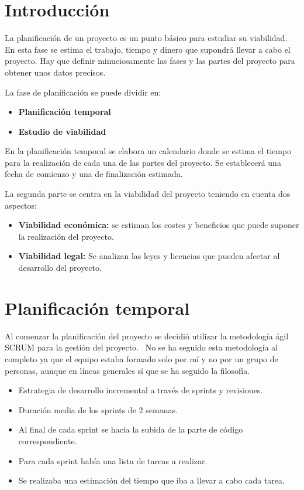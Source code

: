 
\section{Introducción}
La planificación de un proyecto es un punto básico para estudiar su viabilidad. En esta fase se estima el trabajo, tiempo y dinero que supondrá llevar a cabo el proyecto.
Hay que definir minuciosamente las fases y las partes del proyecto para obtener unos datos precisos.

La fase de planificación se puede dividir en:

\begin{itemize}
\tightlist
\item
  \textbf{Planificación temporal} 
\item
  \textbf{Estudio de viabilidad} 

\end{itemize}

En la planificación temporal se elabora un calendario donde se estima el tiempo para la realización de cada una de las partes del proyecto.
Se establecerá una fecha de comienzo y una de finalización estimada.

La segunda parte se centra en la viabilidad del proyecto teniendo en cuenta dos aspectos:

\begin{itemize}
\tightlist
\item
  \textbf{Viabilidad económica:} se estiman los costes y beneficios que puede suponer la realización del proyecto.
\item
  \textbf{Viabilidad legal:} Se analizan las leyes y licencias que pueden afectar al desarrollo del proyecto.

\end{itemize}

\section{Planificación temporal}

Al comenzar la planificación del proyecto se decidió utilizar la metodología ágil SCRUM para la gestión del proyecto.~\cite{scrumGuide}
No se ha seguido esta metodología al completo ya que el equipo estaba formado solo por mí y no por un grupo de personas, aunque en líneas generales sí que se ha seguido la filosofía.

\begin{itemize}
\tightlist
\item
  Estrategia de desarrollo incremental a través de sprints y revisiones.
\item
  Duración media de los sprints de 2 semanas.
\item
  Al final de cada sprint se hacía la subida de la parte de código correspondiente.
  \item
  Para cada sprint había una lista de tareas a realizar.
  \item
  Se realizaba una estimación del tiempo que iba a llevar a cabo cada tarea.
\end{itemize}

